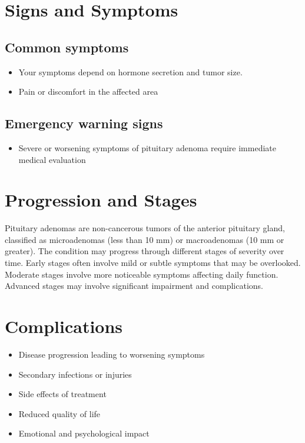 \section{Signs and Symptoms}

\subsection{Common symptoms}
\begin{itemize}[noitemsep]
  \item Your symptoms depend on hormone secretion and tumor size.
  \item Pain or discomfort in the affected area
  \end{itemize}

\subsection{Emergency warning signs}
\begin{itemize}[noitemsep]
  \item Severe or worsening symptoms of pituitary adenoma require immediate medical evaluation
\end{itemize}
\section{Progression and Stages}
Pituitary adenomas are non-cancerous tumors of the anterior pituitary gland, classified as microadenomas (less than 10 mm) or macroadenomas (10 mm or greater). The condition may progress through different stages of severity over time. Early stages often involve mild or subtle symptoms that may be overlooked. Moderate stages involve more noticeable symptoms affecting daily function. Advanced stages may involve significant impairment and complications.
\section{Complications}
\begin{itemize}[noitemsep]
  \item Disease progression leading to worsening symptoms
  \item Secondary infections or injuries
  \item Side effects of treatment
  \item Reduced quality of life
  \item Emotional and psychological impact
\end{itemize}
